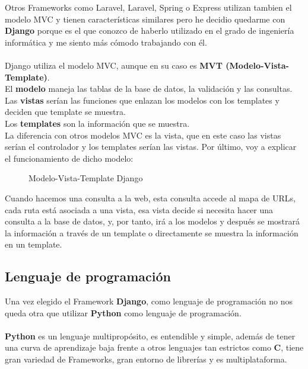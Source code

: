 Otros Frameworks como Laravel, Laravel, Spring o Express utilizan tambien el modelo MVC y tienen características similares pero he decidio quedarme con \textbf{Django} porque es el que conozco de 
haberlo utilizado en el grado de ingeniería informática y me siento más cómodo trabajando con él.\\ \\

Django utiliza el modelo MVC, aunque en su caso es \textbf{MVT (Modelo-Vista-Template)}.\\
El \textbf{modelo} maneja las tablas de la base de datos, la validación y las consultas.\\
Las \textbf{vistas} serían las funciones que enlazan los modelos con los templates y deciden que template se muestra.\\
Los \textbf{templates} son la información que se muestra.\\ 

La diferencia con otros modelos MVC es la vista, que en este caso las vistas serían el controlador y los templates serían las vistas.
Por último, voy a explicar el funcionamiento de dicho modelo:

\begin{figure}[H]
  \centering
  \noindent{}
  \caption{Modelo-Vista-Template Django}
\end{figure}

Cuando hacemos una consulta a la web, esta consulta accede al mapa de URLs, cada ruta está asociada a una vista, 
esa vista decide si necesita hacer una consulta a la base de datos, y, por tanto, irá a los modelos y después se 
mostrará la información a través de un template o directamente se muestra la información en un template.

\subsection{Lenguaje de programación}

Una vez elegido el Framework \textbf{Django}, como lenguaje de programación no nos queda otra que utilizar \textbf{Python} como lenguaje de programación.\\\\
\textbf{Python} es un lenguaje multipropósito, es entendible y simple, además de tener una curva de aprendizaje baja frente a otros lenguajes tan estrictos como \textbf{C}, 
tiene gran variedad de Frameworks, gran entorno de librerías y es multiplataforma.\\ \\

